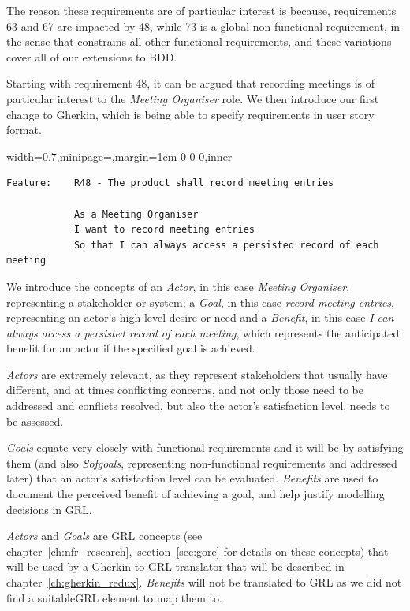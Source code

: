 \documentclass[dissertation,final]{softeng}
\newenvironment{featurecode}[1]
{ \lrbox\featurebox \begin{adjustbox}{width=#1\textwidth,minipage=\textwidth,margin=1cm 0 0 0,inner} }
{ \end{adjustbox}\endlrbox}
\newenvironment{featurelist}[2]
{
\newcommand{\setcaption}{\caption{#1}}
\newcommand{\setlabel}{\label{#2}}
}
{\begin{listing}[h!]\centering\usebox\featurebox\setcaption\setlabel\end{listing}}
\begin{document}
The reason these requirements are of particular interest is because, requirements 63 and 67 are impacted by 48, while 73 is a global non-functional requirement, in the sense that constrains all other functional requirements, and these variations cover all of our extensions to BDD.

Starting with requirement 48, it can be argued that recording meetings is of particular interest to the \emph{Meeting Organiser} role. We then introduce our first change to Gherkin, which is being able to specify requirements in user story format.

\begin{featurelist}{Changes to Gherkin -- User story format}{lst:gherkin_changes_userstory}
\begin{featurecode}{0.7}
\begin{verbatim}
Feature:    R48 - The product shall record meeting entries

            As a Meeting Organiser
            I want to record meeting entries
            So that I can always access a persisted record of each meeting
\end{verbatim}
\end{featurecode}
\end{featurelist}

We introduce the concepts of an \emph{Actor}, in this case \emph{Meeting Organiser}, representing a stakeholder or system; a \emph{Goal}, in this case \emph{record meeting entries}, representing an actor's high-level desire or need and a \emph{Benefit}, in this case \emph{I can always access a persisted record of each meeting}, which represents the anticipated benefit for an actor if the specified goal is achieved.

\emph{Actors} are extremely relevant, as they represent stakeholders that usually have different, and at times conflicting concerns, and not only those need to be addressed and conflicts resolved, but also the actor's satisfaction level, needs to be assessed.

\emph{Goals} equate very closely with functional requirements and it will be by satisfying them (and also \emph{Sofgoals}, representing non-functional requirements and addressed later) that an actor's satisfaction level can be evaluated. \emph{Benefits} are used to document the perceived benefit of achieving a goal, and help justify modelling decisions in GRL.

\emph{Actors} and \emph{Goals} are GRL concepts (see chapter~\ref{ch:nfr_research},~section~\ref{sec:gore} for details on these concepts) that will be used by a Gherkin to GRL translator that will be described in chapter~\ref{ch:gherkin_redux}. \emph{Benefits} will not be translated to GRL as we did not find a suitableGRL element to map them to.
\end{document}

